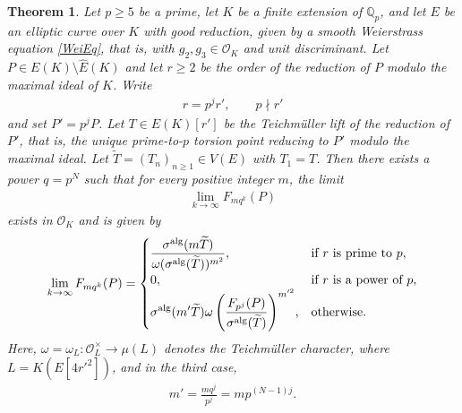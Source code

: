 \documentclass[11pt]{amsart}
\newtheorem{thm}{Theorem}[section]
\theoremstyle{definition}
\begin{document}
\begin{thm}\label{main1}
Let $p \geq 5$ be a prime, let $K$ be a finite extension of $\mathbb{Q}_p$,
and let $E$ be an elliptic curve over $K$ with good reduction, given by a
smooth Weierstrass equation \eqref{WeiEq}, that is, with
$g_2, g_3 \in \mathcal{O}_K$ and unit discriminant.
Let $P \in E(K) \setminus \hat{E}(K)$ and let $r \geq 2$ be the order of the
reduction of $P$ modulo the maximal ideal of $K$. Write 
%
\begin{align*}
r=p^jr', \qquad p \nmid r'
\end{align*}
%
and set $P'=p^jP$. Let $T \in E(K)[r']$ be the Teichm\"{u}ller lift of the reduction of $P'$, that is, the unique prime-to-$p$ torsion point reducing to $P'$ modulo the maximal ideal. 
Let $\widetilde T=(T_n)_{n \geq 1} \in V(E)$ with $T_1=T$. %
Then there exists a power $q=p^N$ such that for every positive integer $m$, the limit 
%
\begin{align*}
\lim_{k\to \infty} F_{mq^k} (P)
\end{align*}
%
exists in $\mathcal{O}_K$ and is given by
%
\begin{align*}
\lim_{k\to \infty} F_{mq^k} (P)=
\begin{cases}
\displaystyle{\frac{\sigma^{\rm alg}(m\widetilde{T})}{\omega(\sigma^{\rm alg}(\widetilde{T}))^{m^2}}}, 
& \text{if $r$ is prime to $p$}, \\
\displaystyle{0}, & \text{if $r$ is a power of $p$}, \\
\displaystyle{\sigma^{\rm alg}(m'\widetilde{T})\omega\left(\frac{F_{p^j}(P)}{\sigma^{\rm alg}(\widetilde{T})}\right)^{m'^2}}, & \text{otherwise}.
\end{cases}
\end{align*}
Here, $\omega=\omega_L : \mathcal{O}_L^{\times} \rightarrow \mu(L)$ denotes the Teichm\"{u}ller character, where $L=K(E[4r'^2])$, and in the third case, 
%
\begin{align*}
m'=\frac{mq^j}{p^j}=mp^{(N-1)j}.
\end{align*}
%
%
%
%
\end{thm}
\end{document}
